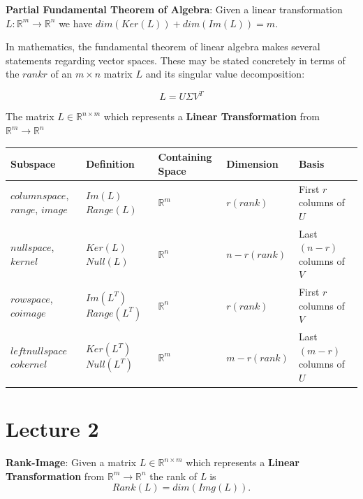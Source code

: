 \documentclass[12pt]{article}
\newenvironment{definition}[2][Definition]{\begin{trivlist}
\item[\hskip \labelsep {\bfseries #1}\hskip \labelsep {\bfseries #2}]}{\end{trivlist}}
\begin{document}
\begin{definition}{1.13} \textbf{Partial Fundamental Theorem of Algebra}: Given a linear transformation \(L:\mathbb{R}^m \rightarrow \mathbb{R}^n\) we have \(dim(Ker(L)) + dim(Im(L)) = m\).

\bigskip
\noindent
In mathematics, the fundamental theorem of linear algebra makes several statements regarding vector spaces. These may be stated concretely in terms of the $rank r$ of an \(m \times n\) matrix $L$ and its singular value decomposition:

\[L = U\Sigma V^T\]

\noindent
The matrix \(L \in \mathbb{R}^{n \times m}\) which represents a \textbf{Linear Transformation} from \(\mathbb{R}^m \rightarrow \mathbb{R}^n\)

\begin{center}
  \begin{tabular}{| p{3cm} | p{2cm} | p{2cm} | l | l |}
    \hline
    Subspace                            & Definition             & Containing Space & Dimension      & Basis \\ \hline
    $column space$, $range$, $image$    & $Im(L)$ $Range(L)$     & \(\mathbb{R}^m\) & $r(rank)$      & First $r$ columns of $U$ \\ \hline
    $nullspace$, $kernel$               & $Ker(L)$ $Null(L)$     & \(\mathbb{R}^n\) & $n-r(rank)$    & Last $(n-r)$ columns of $V$ \\ \hline
    $row space$, $coimage$              & $Im(L^T)$ $Range(L^T)$ & \(\mathbb{R}^n\) & $r(rank)$      & First $r$ columns of $V$ \\ \hline
    $left nullspace$ $cokernel$         & $Ker(L^T)$ $Null(L^T)$ & \(\mathbb{R}^m\) & $m-r(rank)$    & Last $(m-r)$ columns of $U$ \\ \hline
  \end{tabular}
\end{center}
\end{definition}

\section{Lecture 2}
\begin{definition}{2.0} \textbf{Rank-Image}: Given a matrix \(L \in \mathbb{R}^{n \times m}\) which represents a \textbf{Linear Transformation} from \(\mathbb{R}^m \rightarrow \mathbb{R}^n\) the rank of \emph{L} is
\[Rank(L) = dim(Img(L)).\]
\end{definition}
\end{document}
